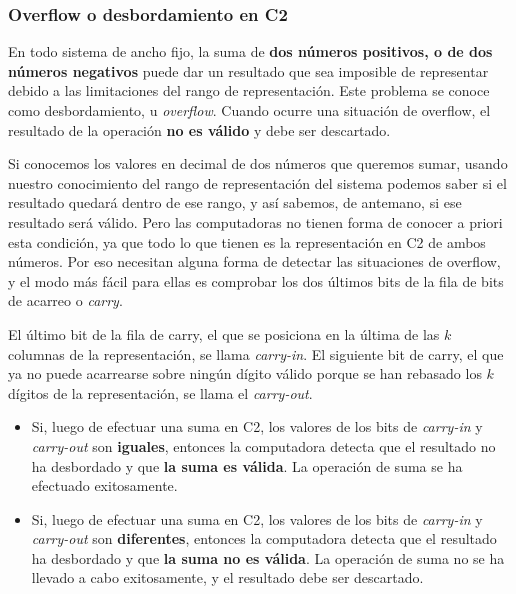 \documentclass[spanish,a4paper,]{article}
\providecommand{\tightlist}{%
  \setlength{\itemsep}{0pt}\setlength{\parskip}{0pt}}
\begin{document}
\hypertarget{overflow-o-desbordamiento-en-c2}{%
\subsubsection{Overflow o desbordamiento en
C2}\label{overflow-o-desbordamiento-en-c2}}

En todo sistema de ancho fijo, la suma de \textbf{dos números positivos,
o de dos números negativos} puede dar un resultado que sea imposible de
representar debido a las limitaciones del rango de representación. Este
problema se conoce como desbordamiento, u \emph{overflow}. Cuando ocurre
una situación de overflow, el resultado de la operación \textbf{no es
válido} y debe ser descartado.

Si conocemos los valores en decimal de dos números que queremos sumar,
usando nuestro conocimiento del rango de representación del sistema
podemos saber si el resultado quedará dentro de ese rango, y así
sabemos, de antemano, si ese resultado será válido. Pero las
computadoras no tienen forma de conocer a priori esta condición, ya que
todo lo que tienen es la representación en C2 de ambos números. Por eso
necesitan alguna forma de detectar las situaciones de overflow, y el
modo más fácil para ellas es comprobar los dos últimos bits de la fila
de bits de acarreo o \emph{carry}.

El último bit de la fila de carry, el que se posiciona en la última de
las \(k\) columnas de la representación, se llama \emph{carry-in}. El
siguiente bit de carry, el que ya no puede acarrearse sobre ningún
dígito válido porque se han rebasado los \(k\) dígitos de la
representación, se llama el \emph{carry-out}.

\begin{itemize}
\tightlist
\item
  Si, luego de efectuar una suma en C2, los valores de los bits de
  \emph{carry-in} y \emph{carry-out} son \textbf{iguales}, entonces la
  computadora detecta que el resultado no ha desbordado y que \textbf{la
  suma es válida}. La operación de suma se ha efectuado exitosamente.
\item
  Si, luego de efectuar una suma en C2, los valores de los bits de
  \emph{carry-in} y \emph{carry-out} son \textbf{diferentes}, entonces
  la computadora detecta que el resultado ha desbordado y que \textbf{la
  suma no es válida}. La operación de suma no se ha llevado a cabo
  exitosamente, y el resultado debe ser descartado.
\end{itemize}
\end{document}
